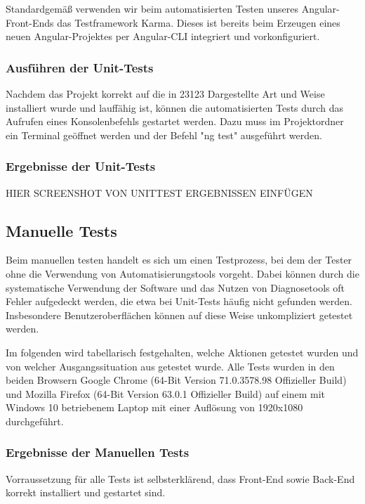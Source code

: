 Standardgemäß verwenden wir beim automatisierten Testen unseres Angular-Front-Ends das Testframework Karma. Dieses ist bereits beim Erzeugen eines neuen Angular-Projektes per Angular-\acs{CLI} integriert und vorkonfiguriert. 

\subsubsection{Ausführen der Unit-Tests}
Nachdem das Projekt korrekt auf die in 23123 Dargestellte Art und Weise installiert wurde und lauffähig ist, können die automatisierten Tests durch das Aufrufen eines Konsolenbefehls gestartet werden. Dazu muss im Projektordner ein Terminal geöffnet werden und der Befehl "ng test" ausgeführt werden.

\subsubsection{Ergebnisse der Unit-Tests}
HIER SCREENSHOT VON UNITTEST ERGEBNISSEN EINFÜGEN


\subsection{Manuelle Tests}
Beim manuellen testen handelt es sich um einen Testprozess, bei dem der Tester ohne die Verwendung von Automatisierungstools vorgeht. Dabei können durch die systematische Verwendung der Software und das Nutzen von Diagnosetools oft Fehler aufgedeckt werden, die etwa bei Unit-Tests häufig nicht gefunden werden. Insbesondere Benutzeroberflächen können auf diese Weise unkompliziert getestet werden.

Im folgenden wird tabellarisch festgehalten, welche Aktionen getestet wurden und von welcher Ausgangssituation aus getestet wurde. Alle Tests wurden in den beiden Browsern Google Chrome (64-Bit Version 71.0.3578.98 Offizieller Build) und Mozilla Firefox (64-Bit Version 63.0.1 Offizieller Build) auf einem mit Windows 10 betriebenem Laptop mit einer Auflösung von 1920x1080 durchgeführt. 

\subsubsection{Ergebnisse der Manuellen Tests}
Vorraussetzung für alle Tests ist selbsterklärend, dass Front-End sowie Back-End korrekt installiert und gestartet sind.

